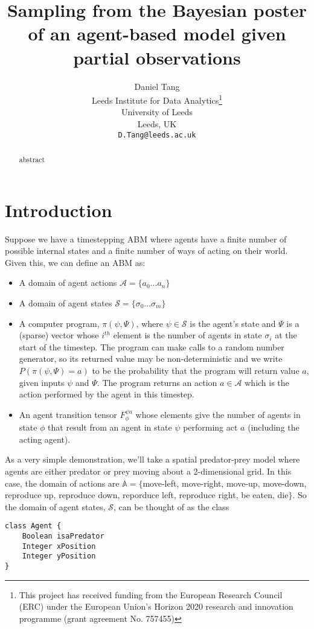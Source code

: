 \documentclass{article}
\title{Sampling from the Bayesian poster of an agent-based model given partial observations}
\author{
  Daniel Tang\\
  Leeds Institute for Data Analytics\thanks{This project has received funding from the European Research Council (ERC) under the European Union’s Horizon 2020 research and innovation programme (grant agreement No. 757455)}\\
  University of Leeds\\
  Leeds, UK\\
  \texttt{D.Tang@leeds.ac.uk} \\
}
\begin{document}
\maketitle

\begin{abstract}
abstract
\end{abstract}


\section{Introduction}


Suppose we have a timestepping ABM where agents have a finite number of possible internal states and a finite number of ways of acting on their world. Given this, we can define an ABM as:
\begin{itemize}
\item A domain of agent actions $\mathcal{A} =\{ a_0 ... a_n \}$

\item A domain of agent states $\mathcal{S} = \{\sigma_0 ... \sigma_m\}$

\item A computer program, $\pi(\psi,\Psi)$,  where $\psi \in \mathcal{S}$ is the agent's state and $\Psi$ is a (sparse) vector whose $i^{th}$ element is the number of agents in state $\sigma_i$ at the start of the timestep. The program can make calls to a random number generator, so its returned value may be non-deterministic and we write $P(\pi(\psi,\Psi)=a)$ to be the probability that the program will return value $a$, given inputs $\psi$ and $\Psi$. The program returns an action $a \in \mathcal{A}$ which is the action  performed by the agent in this timestep.

\item An agent transition tensor $F_\phi^{\psi a}$ whose elements give the number of agents in state $\phi$ that result from an agent in state $\psi$ performing act $a$ (including the acting agent).
\end{itemize}

As a very simple demonstration, we'll take a spatial predator-prey model where agents are either predator or prey moving about a 2-dimensional grid. In this case, the domain of actions are $\mathbb{A} = \{$move-left, move-right, move-up, move-down, reproduce up, reproduce down, reporduce left, reproduce right, be eaten, die$\}$. So the domain of agent states, $\mathcal{S}$, can be thought of as the class 
\begin{lstlisting}
class Agent {
	Boolean	isaPredator
	Integer	xPosition
	Integer	yPosition
}
\end{lstlisting}
\end{document}
